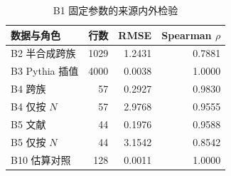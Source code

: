 \begin{table}[H]\centering\small
\caption{B1 固定参数的来源内外检验}\label{tab:q2-v39-external}
\begin{tabular}{lrrr}\toprule 数据与角色 & 行数 & RMSE & Spearman $\rho$\\\midrule
B2 半合成跨族 & 1029 & 1.2431 & 0.7881 \\
B3 Pythia 插值 & 4000 & 0.0038 & 1.0000 \\
B4 跨族 & 57 & 0.2927 & 0.9830 \\
B4 仅按 $N$ & 57 & 2.9768 & 0.9555 \\
B5 文献 & 44 & 0.1976 & 0.9588 \\
B5 仅按 $N$ & 44 & 3.1542 & 0.8542 \\
B10 估算对照 & 128 & 0.0011 & 1.0000 \\
\bottomrule\end{tabular}\end{table}
